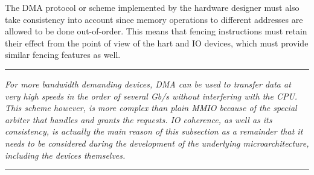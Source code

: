         The DMA protocol or scheme implemented by the hardware designer must also take consistency into account since memory operations to different addresses are allowed to be done out-of-order. This means that fencing instructions must retain their effect from the point of view of the hart and IO devices, which must provide similar fencing features as well.

    \par\noindent\rule{\textwidth}{0.4pt}
    \textit{For more bandwidth demanding devices, DMA can be used to transfer data at very high speeds in the order of several Gb/s without interfering with the CPU. This scheme however, is more complex than plain MMIO because of the special arbiter that handles and grants the requests. IO coherence, as well as its consistency, is actually the main reason of this subsection as a remainder that it needs to be considered during the development of the underlying microarchitecture, including the devices themselves.}
    \par\noindent\rule{\textwidth}{0.4pt}